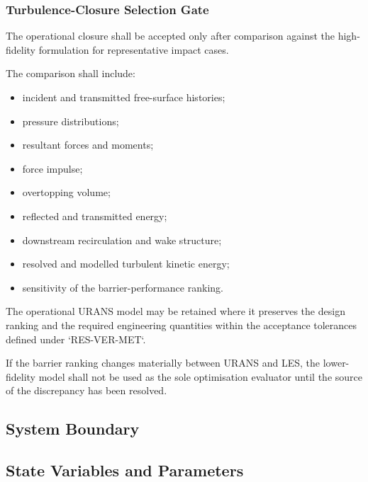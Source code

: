 \subsubsection{Turbulence-Closure Selection Gate}
\label{sec:res-mod-src-local-closure-gate}

The operational closure shall be accepted only after comparison against
the high-fidelity formulation for representative impact cases.

The comparison shall include:

\begin{itemize}
  \item incident and transmitted free-surface histories;
  \item pressure distributions;
  \item resultant forces and moments;
  \item force impulse;
  \item overtopping volume;
  \item reflected and transmitted energy;
  \item downstream recirculation and wake structure;
  \item resolved and modelled turbulent kinetic energy;
  \item sensitivity of the barrier-performance ranking.
\end{itemize}

The operational URANS model may be retained where it preserves the
design ranking and the required engineering quantities within the
acceptance tolerances defined under `RES-VER-MET`.

If the barrier ranking changes materially between URANS and LES, the
lower-fidelity model shall not be used as the sole optimisation
evaluator until the source of the discrepancy has been resolved.

\subsection{System Boundary}
\label{sec:res-mod-src-system-boundary}


\subsection{State Variables and Parameters}
\label{sec:res-mod-src-state-variables-parameters}


